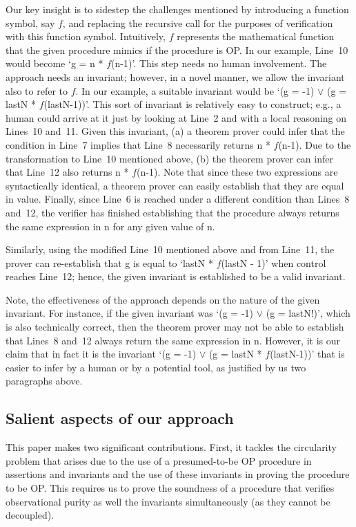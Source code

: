 Our key insight is to sidestep the challenges mentioned by introducing a
function symbol, say $f$, and replacing the recursive call for the purposes
of verification with this function symbol. Intuitively, $f$ represents the
mathematical function that the given procedure mimics if the procedure is
OP.  In our example, Line~10 would become `g = n * $f$(n-1)'. This step
needs no human involvement. The approach needs an invariant; however, in a
novel manner, we allow the invariant also to refer to $f$. In our example,
a suitable invariant would be `(g = -1) $\vee$ (g = lastN *
$f$(lastN-1))'. This sort of invariant is relatively easy to construct;
e.g., a human could arrive at it just by looking at Line~2 and with a local
reasoning on Lines~10 and~11. Given this invariant, (a) a theorem prover
could infer that the condition in Line~7 implies that Line~8 necessarily
returns n * $f$(n-1). Due to the transformation to Line~10 mentioned above,
(b) the theorem prover can infer that Line~12 also returns n *
$f$(n-1). Note that since these two expressions are syntactically
identical, a theorem prover can easily establish that they are equal in
value.  Finally, since Line~6 is reached under a different condition than
Lines~8 and~12, the verifier has finished establishing that the procedure
always returns the same expression in n for any given value of n.

Similarly, using the modified Line~10 mentioned above and from Line~11, the
prover can re-establish that g is equal to `lastN * $f$(lastN - 1)' when
control reaches Line~12; hence, the given invariant is established to be a
valid invariant.

Note, the effectiveness of the approach depends on the nature of the given
invariant. For instance, if the given invariant was `(g = -1) $\vee$ (g =
lastN!)', which is also technically correct, then the theorem prover may
not be able to establish that Lines~8 and~12 always return the same
expression in n. However, it is our claim that in fact it is the invariant
`(g = -1) $\vee$ (g = lastN * $f$(lastN-1))' that is easier to infer by a
human or by a potential tool, as justified by us two paragraphs above.

\subsection{Salient aspects of our approach}

This paper makes two significant contributions. First, it tackles the circularity
problem that arises due to the use of a presumed-to-be OP procedure
in assertions and invariants and the use of these invariants in proving the
procedure to be OP. This requires us to prove the soundness of a procedure
that verifies observational purity as well the invariants simultaneously (as they
cannot be decoupled).

